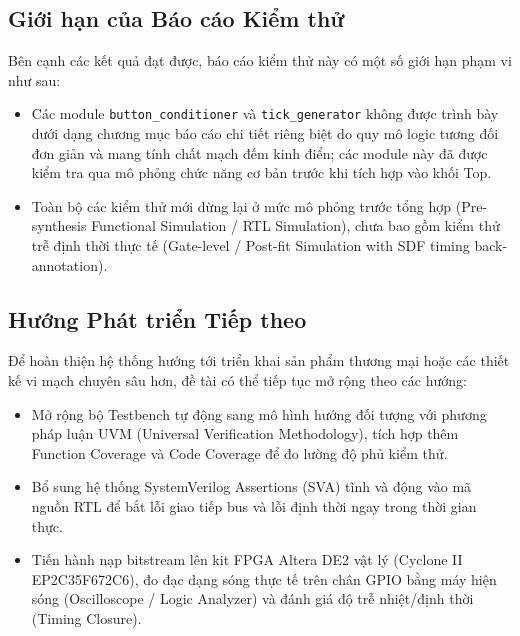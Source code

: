 \documentclass[12pt,a4paper]{article}
\begin{document}
\subsection{Giới hạn của Báo cáo Kiểm thử}
Bên cạnh các kết quả đạt được, báo cáo kiểm thử này có một số giới hạn phạm vi như sau:
\begin{itemize}
    \item Các module \texttt{button\_conditioner} và \texttt{tick\_generator} không được trình bày dưới dạng chương mục báo cáo chi tiết riêng biệt do quy mô logic tương đối đơn giản và mang tính chất mạch đếm kinh điển; các module này đã được kiểm tra qua mô phỏng chức năng cơ bản trước khi tích hợp vào khối Top.
    \item Toàn bộ các kiểm thử mới dừng lại ở mức mô phỏng trước tổng hợp (Pre-synthesis Functional Simulation / RTL Simulation), chưa bao gồm kiểm thử trễ định thời thực tế (Gate-level / Post-fit Simulation with SDF timing back-annotation).
\end{itemize}

\subsection{Hướng Phát triển Tiếp theo}
Để hoàn thiện hệ thống hướng tới triển khai sản phẩm thương mại hoặc các thiết kế vi mạch chuyên sâu hơn, đề tài có thể tiếp tục mở rộng theo các hướng:
\begin{itemize}
    \item Mở rộng bộ Testbench tự động sang mô hình hướng đối tượng với phương pháp luận UVM (Universal Verification Methodology), tích hợp thêm Function Coverage và Code Coverage để đo lường độ phủ kiểm thử.
    \item Bổ sung hệ thống SystemVerilog Assertions (SVA) tĩnh và động vào mã nguồn RTL để bắt lỗi giao tiếp bus và lỗi định thời ngay trong thời gian thực.
    \item Tiến hành nạp bitstream lên kit FPGA Altera DE2 vật lý (Cyclone II EP2C35F672C6), đo đạc dạng sóng thực tế trên chân GPIO bằng máy hiện sóng (Oscilloscope / Logic Analyzer) và đánh giá độ trễ nhiệt/định thời (Timing Closure).
\end{itemize}
\end{document}
